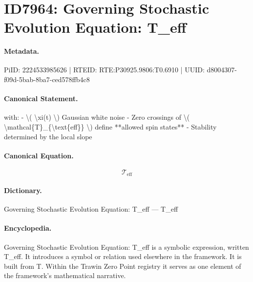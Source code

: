 \section*{ID7964: Governing Stochastic Evolution Equation: T\_eff}
\paragraph{Metadata.}
PiID: 2224533985626 | RTEID: RTE:P30925.9806:T0.6910 | UUID: d8004307-f09d-5bab-8ba7-ced578ffb4c8

\paragraph{Canonical Statement.}
with: - \textbackslash{}( \textbackslash{}xi(t) \textbackslash{}) Gaussian white noise - Zero crossings of \textbackslash{}( \textbackslash{}mathcal\{T\}\_\{\textbackslash{}text\{eff\}\} \textbackslash{}) define **allowed spin states** - Stability determined by the local slope

\paragraph{Canonical Equation.}
\[
\mathcal{T}_{\text{eff}}
\]

\paragraph{Dictionary.}
Governing Stochastic Evolution Equation: T\_eff — T\_eff

\paragraph{Encyclopedia.}
Governing Stochastic Evolution Equation: T\_eff is a symbolic expression, written T\_eff. It introduces a symbol or relation used elsewhere in the framework. It is built from T. Within the Trawin Zero Point registry it serves as one element of the framework's mathematical narrative.

